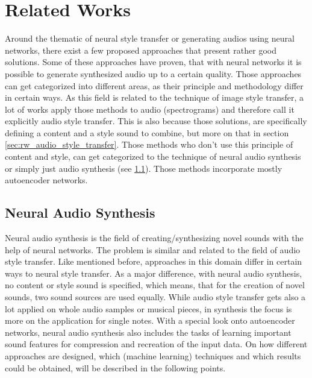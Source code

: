 \chapter{Related Works}

Around the thematic of neural style transfer or generating audios using neural networks, there exist a few proposed approaches that present rather good solutions. Some of these approaches have proven, that with neural networks it is possible to generate synthesized audio up to a certain quality. Those approaches can get categorized into different areas, as their principle and methodology differ in certain ways. As this field is related to the technique of image style transfer, a lot of works apply those methods to audio (spectrograms) and therefore call it explicitly audio style transfer. This is also because those solutions, are specifically defining a content and a style sound to combine, but more on that in section \ref{sec:rw_audio_style_transfer}. Those methods who don't use this principle of content and style, can get categorized to the technique of neural audio synthesis or simply just audio synthesis (see \ref{sec:rw_neural_audio_synthesis}). Those methods incorporate mostly autoencoder networks. 

\section{Neural Audio Synthesis}
\label{sec:rw_neural_audio_synthesis}
Neural audio synthesis is the field of creating/synthesizing novel sounds with the help of neural networks. The problem is similar and related to the field of audio style transfer. Like mentioned before, approaches in this domain differ in certain ways to neural style transfer. As a major difference, with neural audio synthesis, no content or style sound is specified, which means, that for the creation of novel sounds, two sound sources are used equally. While audio style transfer gets also a lot applied on whole audio samples or musical pieces, in synthesis the focus is more on the application for single notes. With a special look onto autoencoder networks, neural audio synthesis also includes the tasks of learning important sound features for compression and recreation of the input data. On how different approaches are designed, which (machine learning) techniques and which results could be obtained, will be described in the following points.\\

